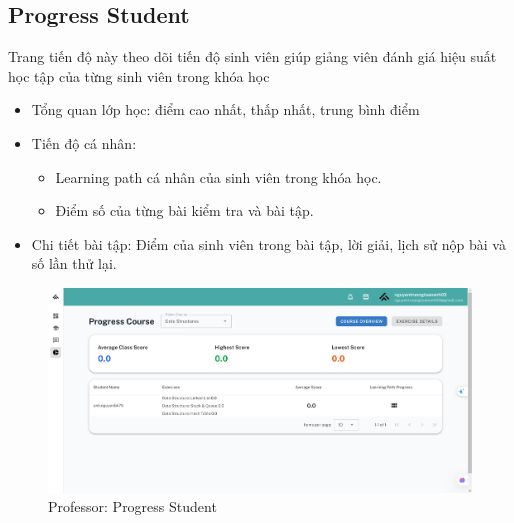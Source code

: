 \subsection{Progress Student}
Trang tiến độ này theo dõi tiến độ sinh viên giúp giảng viên đánh giá hiệu suất học tập của từng sinh viên trong khóa học
\begin{itemize}
    \item Tổng quan lớp học: điểm cao nhất, thấp nhất, trung bình điểm
    \item Tiến độ cá nhân: 
    \begin{itemize}
        \item Learning path cá nhân của sinh viên trong khóa học.
        \item Điểm số của từng bài kiểm tra và bài tập.
    \end{itemize}
    \item Chi tiết bài tập: Điểm của sinh viên trong bài tập, lời giải, lịch sử nộp bài và số lần thử lại.
\end{itemize}
 \begin{figure}[H]
        \centering
        \includegraphics[width=0.8\linewidth]{images/progress_professor.png}
        \caption{Professor: Progress Student}
        \label{fig:enter-label}
    \end{figure}
